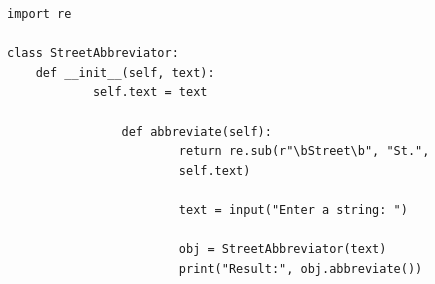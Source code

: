 \begin{verbatim}
import re

class StreetAbbreviator:
    def __init__(self, text):
            self.text = text

                def abbreviate(self):
                        return re.sub(r"\bStreet\b", "St.", 
                        self.text)

                        text = input("Enter a string: ")

                        obj = StreetAbbreviator(text)
                        print("Result:", obj.abbreviate())
\end{verbatim}